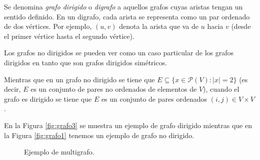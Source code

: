\begin{definition}
Se denomina \emph{grafo dirigido} o \emph{digrafo} a aquellos grafos cuyas aristas tengan un sentido definido. En un digrafo, cada arista se representa como un par ordenado de dos vértices. Por ejemplo, $(u,v)$ denota la arista que va de $u$ hacia $v$ (desde el primer vértice hasta el segundo vértice).

Los grafos no dirigidos se pueden ver como un caso particular de los grafos dirigidos en tanto que son grafos dirigidos simétricos.

Mientras que en un grafo no dirigido se tiene que $E \subseteq \{x \in \mathcal{P}(V) : |x| = 2\}$ (es decir, $E$ es un conjunto de pares no ordenados de elementos de $V$), cuando el grafo es dirigido se tiene que $E$ es un conjunto de pares ordenados $(i,j) \in V \times V$.
\end{definition}

\begin{exampleth}
En la Figura \ref{fig:grafo3} se muestra un ejemplo de grafo dirigido mientras que en la Figura \ref{fig:grafo1} tenemos un ejemplo de grafo no dirigido.
\end{exampleth}

\begin{wrapfigure}{r}{0.4\textwidth} %
    \centering
{}
	\caption{Ejemplo de multigrafo.}
	\label{fig:grafo4}
\end{wrapfigure}

